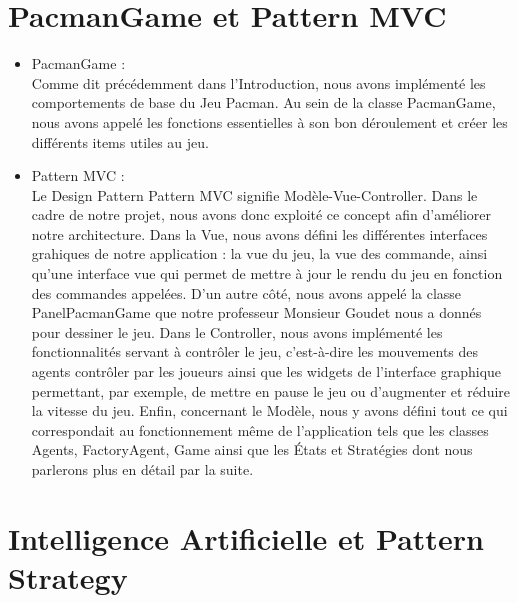 \documentclass[a4paper, 11pt]{article}
\begin{document}
\part{PacmanGame et Pattern MVC}
\begin{itemize}
  \item PacmanGame :  \\ 
  
Comme dit précédemment dans l'Introduction, nous avons implémenté les comportements de base du Jeu Pacman. Au sein de la classe PacmanGame, nous avons appelé
les fonctions essentielles à son bon déroulement et créer les différents items utiles au jeu. \\
 
  \item Pattern MVC : \\
  
Le Design Pattern Pattern MVC signifie Modèle-Vue-Controller. Dans le cadre de notre projet, nous avons donc exploité ce concept afin d'améliorer
notre architecture. Dans la Vue, nous avons défini les différentes interfaces grahiques de notre application : la vue du jeu, la vue des commande,
ainsi qu'une interface vue qui permet de mettre à jour le rendu du jeu en fonction des commandes appelées. D'un autre côté, nous avons appelé la
classe PanelPacmanGame que notre professeur Monsieur Goudet nous a donnés pour dessiner le jeu. Dans le Controller, nous avons implémenté les 
fonctionnalités servant à contrôler le jeu, c'est-à-dire les mouvements des agents contrôler par les joueurs ainsi que les widgets de l'interface
graphique permettant, par exemple, de mettre en pause le jeu ou d'augmenter et réduire la vitesse du jeu. Enfin, concernant le Modèle, nous y avons
défini tout ce qui correspondait au fonctionnement même de l'application tels que les classes Agents, FactoryAgent, Game ainsi que les États et Stratégies 
dont nous parlerons plus en détail par la suite. 

\end{itemize}

\part{Intelligence Artificielle et Pattern Strategy}
\end{document}
